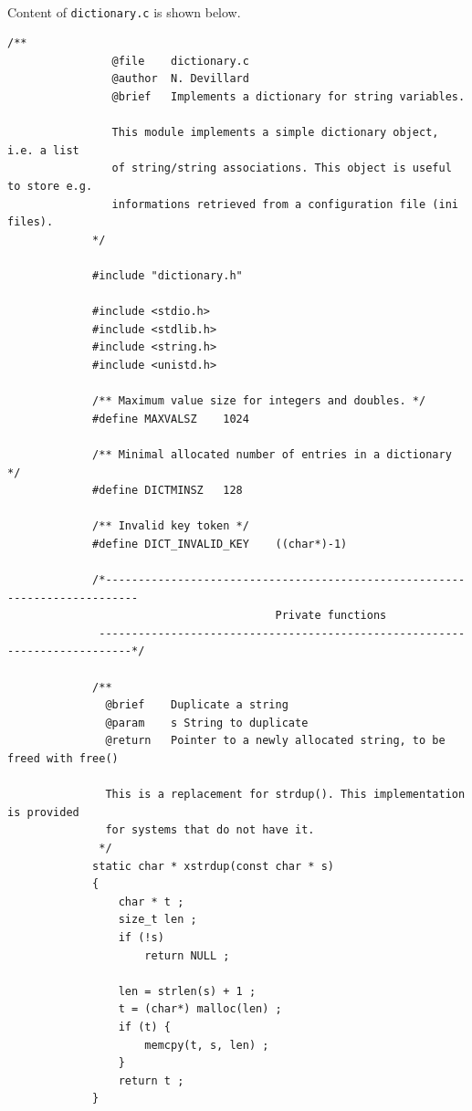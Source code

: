 \documentclass{article}
\begin{document}
            \paragraph{}
                Content of \texttt{dictionary.c} is shown below.
            \begin{Verbatim}[gobble=8]
                /**
                @file    dictionary.c
                @author  N. Devillard
                @brief   Implements a dictionary for string variables.
             
                This module implements a simple dictionary object, i.e. a list
                of string/string associations. This object is useful to store e.g.
                informations retrieved from a configuration file (ini files).
             */
             
             #include "dictionary.h"
             
             #include <stdio.h>
             #include <stdlib.h>
             #include <string.h>
             #include <unistd.h>
             
             /** Maximum value size for integers and doubles. */
             #define MAXVALSZ    1024
             
             /** Minimal allocated number of entries in a dictionary */
             #define DICTMINSZ   128
             
             /** Invalid key token */
             #define DICT_INVALID_KEY    ((char*)-1)
             
             /*---------------------------------------------------------------------------
                                         Private functions
              ---------------------------------------------------------------------------*/
             
             /**
               @brief    Duplicate a string
               @param    s String to duplicate
               @return   Pointer to a newly allocated string, to be freed with free()
             
               This is a replacement for strdup(). This implementation is provided
               for systems that do not have it.
              */
             static char * xstrdup(const char * s)
             {
                 char * t ;
                 size_t len ;
                 if (!s)
                     return NULL ;
             
                 len = strlen(s) + 1 ;
                 t = (char*) malloc(len) ;
                 if (t) {
                     memcpy(t, s, len) ;
                 }
                 return t ;
             }
             

\end{Verbatim}
\end{document}
